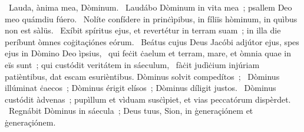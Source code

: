 \psalmChapterWithInscription{}
{ }
{%
~Lauda, ànima mea, Dòminum. 
~Laudábo Dòminum in vita mea~; psallem Deo meo quámdiu fúero. 
~Nolíte confídere in prinċìpibus, in fíliïs hòminum, in quìbus non est sàlüs. 
~Exíbit spíritus ejus, et revertétur in terram suam~; in illa die períbunt òmnes coġitaçiónes eórum. 
~Beátus cujus Deus Jacóbi adjútor ejus, spes ejus in Dòmino Deo ìpsius, 
~qui feċit ċaelum et terram, mare, et òmnia quae in eïs sunt~; qui custódit veritátem in sáeculum, 
~fàċit judìċium injúriam patièntibus, dat escam esurièntibus. Dòminus solvit compedítos~; 
~Dòminus illúminat ċaecos~; Dòminus érigit elísos~; Dòminus díligit justos. 
~Dòminus custódit àdvenas~; pupìllum et vìduam susċìpiet, et vias peccatórum dispèrdet. 
~Regnábit Dòminus in sáecula~; Deus tuus, Sion, in ġeneraçiónem et ġeneraçiónem. 
}
